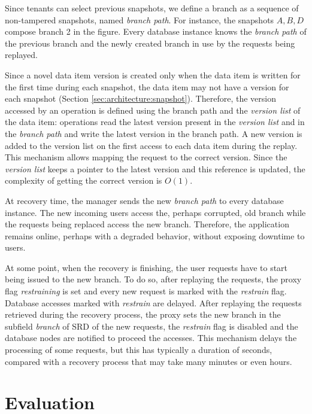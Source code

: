 \documentclass[10pt,conference]{IEEEtran}
\begin{document}
Since tenants can select previous snapshots, we define a branch as a sequence of non-tampered snapshots, named \emph{branch path}. For instance, the snapshots $A,B,D$ compose  branch 2 in the figure. Every database instance knows the \emph{branch path} of the previous branch and the newly created branch in use by the requests being replayed.

Since a novel data item version is created only when the data item is written for the first time during each snapshot, the data item may not have a version for each snapshot (Section \ref{sec:architecture:snapshot}). Therefore, the version \DIFdelbegin {}\DIFdelend accessed by an operation is defined using the branch path and the \emph{version list} of the data item: operations read the latest version present in the \emph{version list} and in the \emph{branch path} and write the latest version in the branch path. A new version is added to the version list on the first \DIFdelbegin {}\DIFdelend access to each data item during the replay. This mechanism allows mapping the request to the correct version. Since the \emph{version list} keeps a pointer to the latest version and this reference is updated, the complexity of getting the correct version is $O(1)$. 

At recovery time, the manager sends the new \emph{branch path} to every database instance. The new incoming users access the, perhaps corrupted, old branch while the requests being replaced access the new branch. Therefore, the application remains online, perhaps with a degraded behavior, without exposing downtime to users.

At some point, when the recovery is finishing, the user requests have to start being issued to the new branch. To do so, after replaying the requests, the proxy flag \emph{restraining} is set and every new request is marked with the \emph{restrain} flag. Database accesses marked with \emph{restrain} are delayed. After replaying the requests retrieved during the recovery process, the proxy sets the new branch in the subfield \emph{branch} of \ac{SRD} of the new requests, the \emph{restrain} flag is disabled and the database nodes are notified to proceed the accesses. This mechanism delays the processing of some requests, but this has typically a duration of seconds, compared with a recovery process that may take many minutes or even hours.

\section{Evaluation}
\label{sec:evaluation}
\end{document}
